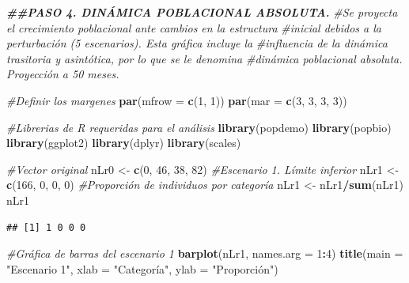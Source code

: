 \documentclass[
]{book}
\newenvironment{Shaded}{\begin{snugshade}}{\end{snugshade}}
\newcommand{\AttributeTok}[1]{\textcolor[rgb]{0.13,0.29,0.53}{#1}}
\newcommand{\CommentTok}[1]{\textcolor[rgb]{0.56,0.35,0.01}{\textit{#1}}}
\newcommand{\DecValTok}[1]{\textcolor[rgb]{0.00,0.00,0.81}{#1}}
\newcommand{\DocumentationTok}[1]{\textcolor[rgb]{0.56,0.35,0.01}{\textbf{\textit{#1}}}}
\newcommand{\FunctionTok}[1]{\textcolor[rgb]{0.13,0.29,0.53}{\textbf{#1}}}
\newcommand{\NormalTok}[1]{#1}
\newcommand{\OtherTok}[1]{\textcolor[rgb]{0.56,0.35,0.01}{#1}}
\newcommand{\SpecialCharTok}[1]{\textcolor[rgb]{0.81,0.36,0.00}{\textbf{#1}}}
\newcommand{\StringTok}[1]{\textcolor[rgb]{0.31,0.60,0.02}{#1}}
\theoremstyle{definition}
\theoremstyle{definition}
\theoremstyle{definition}
\theoremstyle{definition}
\theoremstyle{remark}
\begin{document}
\begin{Shaded}
\begin{Highlighting}[]
\DocumentationTok{\#\#PASO 4. DINÁMICA POBLACIONAL ABSOLUTA.    }
\CommentTok{\#Se proyecta el crecimiento poblacional ante cambios en la estructura }
\CommentTok{\#inicial debidos a la perturbación (5 escenarios). Esta gráfica incluye la }
\CommentTok{\#influencia de la dinámica trasitoria y asintótica, por lo que se le denomina }
\CommentTok{\#dinámica poblacional absoluta. Proyección a 50 meses.}

\CommentTok{\#Definir los margenes}
\FunctionTok{par}\NormalTok{(}\AttributeTok{mfrow =} \FunctionTok{c}\NormalTok{(}\DecValTok{1}\NormalTok{, }\DecValTok{1}\NormalTok{))}
\FunctionTok{par}\NormalTok{(}\AttributeTok{mar =} \FunctionTok{c}\NormalTok{(}\DecValTok{3}\NormalTok{, }\DecValTok{3}\NormalTok{, }\DecValTok{3}\NormalTok{, }\DecValTok{3}\NormalTok{))}

\CommentTok{\#Librerias de R requeridas para el análisis }
\FunctionTok{library}\NormalTok{(popdemo)}
\FunctionTok{library}\NormalTok{(popbio)}
\FunctionTok{library}\NormalTok{(ggplot2)}
\FunctionTok{library}\NormalTok{(dplyr)}
\FunctionTok{library}\NormalTok{(scales)}

\CommentTok{\#Vector original}
\NormalTok{nLr0 }\OtherTok{\textless{}{-}} \FunctionTok{c}\NormalTok{(}\DecValTok{0}\NormalTok{, }\DecValTok{46}\NormalTok{, }\DecValTok{38}\NormalTok{, }\DecValTok{82}\NormalTok{)}
\CommentTok{\#Escenario 1. Límite inferior}
\NormalTok{nLr1 }\OtherTok{\textless{}{-}} \FunctionTok{c}\NormalTok{(}\DecValTok{166}\NormalTok{, }\DecValTok{0}\NormalTok{, }\DecValTok{0}\NormalTok{, }\DecValTok{0}\NormalTok{)}
\CommentTok{\#Proporción de individuos por categoría}
\NormalTok{nLr1 }\OtherTok{\textless{}{-}}\NormalTok{ nLr1}\SpecialCharTok{/}\FunctionTok{sum}\NormalTok{(nLr1)}
\NormalTok{nLr1}
\end{Highlighting}
\end{Shaded}

\begin{verbatim}
## [1] 1 0 0 0
\end{verbatim}

\begin{Shaded}
\begin{Highlighting}[]
\CommentTok{\#Gráfica de barras del escenario 1 }
\FunctionTok{barplot}\NormalTok{(nLr1, }\AttributeTok{names.arg =} \DecValTok{1}\SpecialCharTok{:}\DecValTok{4}\NormalTok{)}
\FunctionTok{title}\NormalTok{(}\AttributeTok{main =} \StringTok{"Escenario 1"}\NormalTok{, }\AttributeTok{xlab =} \StringTok{"Categoría"}\NormalTok{, }\AttributeTok{ylab =} \StringTok{"Proporción"}\NormalTok{)}
\end{Highlighting}
\end{Shaded}
\end{document}
